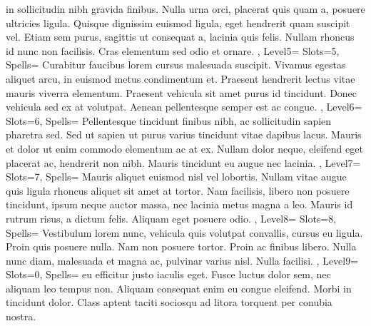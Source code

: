 \documentclass[10pt,a4paper]{scrbook}
\begin{document}
{{{				in sollicitudin nibh gravida finibus.
				Nulla urna orci, placerat quis quam a,
				posuere ultricies ligula.
				Quisque dignissim euismod ligula,
				eget hendrerit quam suscipit vel.
				Etiam sem purus, sagittis ut consequat a,
				lacinia quis felis.
				Nullam rhoncus id nunc non facilisis.
				Cras elementum sed odio et ornare.
			}
		},
		Level5={
			Slots=5,
			Spells={
				Curabitur faucibus lorem cursus malesuada suscipit.
				Vivamus egestas aliquet arcu,
				in euismod metus condimentum et.
				Praesent hendrerit lectus vitae mauris viverra elementum.
				Praesent vehicula sit amet purus id tincidunt.
				Donec vehicula sed ex at volutpat.
				Aenean pellentesque semper est ac congue.
			}
		},
		Level6={
			Slots=6,
			Spells={
				Pellentesque tincidunt finibus nibh,
				ac sollicitudin sapien pharetra sed.
				Sed ut sapien ut purus varius tincidunt vitae dapibus lacus.
				Mauris et dolor ut enim commodo elementum ac at ex.
				Nullam dolor neque, eleifend eget placerat ac,
				hendrerit non nibh.
				Mauris tincidunt eu augue nec lacinia.
			}
		},
		Level7={
			Slots=7,
			Spells={
				Mauris aliquet euismod nisl vel lobortis.
				Nullam vitae augue quis ligula rhoncus aliquet sit amet at tortor.
				Nam facilisis, libero non posuere tincidunt,
				ipsum neque auctor massa, nec lacinia metus magna a leo.
				Mauris id rutrum risus, a dictum felis.
				Aliquam eget posuere odio.
			}
		},
		Level8={
			Slots=8,
			Spells={
				Vestibulum lorem nunc, vehicula quis volutpat convallis,
				cursus eu ligula. Proin quis posuere nulla.
				Nam non posuere tortor.
				Proin ac finibus libero.
				Nulla nunc diam, malesuada et magna ac,
				pulvinar varius nisl.
				Nulla facilisi.
			}
		},
		Level9={
			Slots=0,
			Spells={
				eu efficitur justo iaculis eget.
				Fusce luctus dolor sem, nec aliquam leo tempus non.
				Aliquam consequat enim eu congue eleifend.
				Morbi in tincidunt dolor.
				Class aptent taciti sociosqu ad litora torquent
				per conubia nostra.
			}
		}
	}
\end{document}
